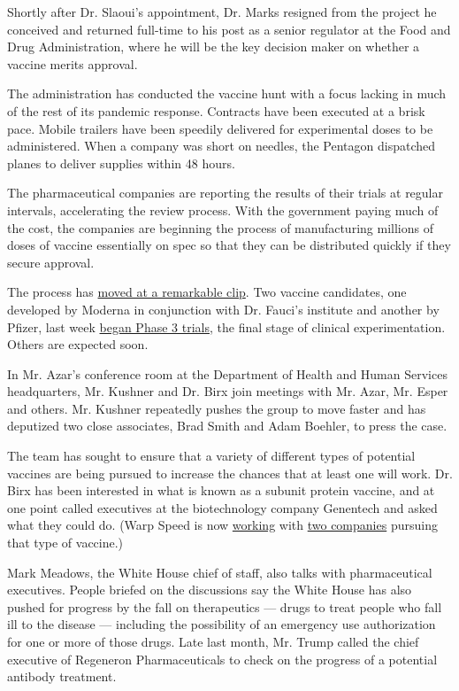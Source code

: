 Shortly after Dr. Slaoui's appointment, Dr. Marks resigned from the
project he conceived and returned full-time to his post as a senior
regulator at the Food and Drug Administration, where he will be the key
decision maker on whether a vaccine merits approval.

The administration has conducted the vaccine hunt with a focus lacking
in much of the rest of its pandemic response. Contracts have been
executed at a brisk pace. Mobile trailers have been speedily delivered
for experimental doses to be administered. When a company was short on
needles, the Pentagon dispatched planes to deliver supplies within 48
hours.

The pharmaceutical companies are reporting the results of their trials
at regular intervals, accelerating the review process. With the
government paying much of the cost, the companies are beginning the
process of manufacturing millions of doses of vaccine essentially on
spec so that they can be distributed quickly if they secure approval.

The process has
\href{https://www.nytimes.com/2020/07/14/health/cornavirus-vaccine-moderna.html}{moved
at a remarkable clip}. Two vaccine candidates, one developed by Moderna
in conjunction with Dr. Fauci's institute and another by Pfizer, last
week
\href{https://www.nytimes.com/2020/07/27/health/moderna-vaccine-covid.html}{began
Phase 3 trials}, the final stage of clinical experimentation. Others are
expected soon.

In Mr. Azar's conference room at the Department of Health and Human
Services headquarters, Mr. Kushner and Dr. Birx join meetings with Mr.
Azar, Mr. Esper and others. Mr. Kushner repeatedly pushes the group to
move faster and has deputized two close associates, Brad Smith and Adam
Boehler, to press the case.

The team has sought to ensure that a variety of different types of
potential vaccines are being pursued to increase the chances that at
least one will work. Dr. Birx has been interested in what is known as a
subunit protein vaccine, and at one point called executives at the
biotechnology company Genentech and asked what they could do. (Warp
Speed is now
\href{https://www.nytimes.com/2020/07/16/health/coronavirus-vaccine-novavax.html}{working}
with
\href{https://www.nytimes.com/2020/07/31/health/covid-19-vaccine-sanofi-gsk.html}{two
companies} pursuing that type of vaccine.)

Mark Meadows, the White House chief of staff, also talks with
pharmaceutical executives. People briefed on the discussions say the
White House has also pushed for progress by the fall on therapeutics ---
drugs to treat people who fall ill to the disease --- including the
possibility of an emergency use authorization for one or more of those
drugs. Late last month, Mr. Trump called the chief executive of
Regeneron Pharmaceuticals to check on the progress of a potential
antibody treatment.

